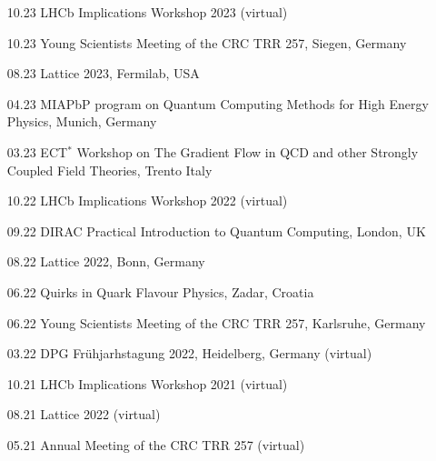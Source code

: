 \documentclass[10pt]{article} %
\begin{document}
\begin{paracol}{2}
\begin{itemize}[noitemsep,topsep=1pt,label=]
    \item [10.23] LHCb Implications Workshop 2023 (virtual)
    \item [10.23] Young Scientists Meeting of the CRC TRR 257, Siegen, Germany
    \item [08.23] Lattice 2023, Fermilab, USA
    \item [04.23] MIAPbP program on Quantum Computing Methods for High Energy Physics, Munich, Germany
    \item [03.23] ECT$^*$ Workshop on The Gradient Flow in QCD and other Strongly Coupled Field Theories, Trento Italy
    \item [10.22] LHCb Implications Workshop 2022 (virtual)
    \item [09.22] DIRAC Practical Introduction to Quantum Computing, London, UK
    \item [08.22] Lattice 2022, Bonn, Germany
    \item [06.22] Quirks in Quark Flavour Physics, Zadar, Croatia
    \item [06.22] Young Scientists Meeting of the CRC TRR 257, Karlsruhe, Germany
    \item [03.22] DPG Fr\"uhjarhstagung 2022, Heidelberg, Germany (virtual)
    \item [10.21] LHCb Implications Workshop 2021 (virtual)
    \item [08.21] Lattice 2022 (virtual)
    \item [05.21] Annual Meeting of the CRC TRR 257 (virtual) 
\end{itemize}


\switchcolumn %



\end{paracol}
\end{document}
